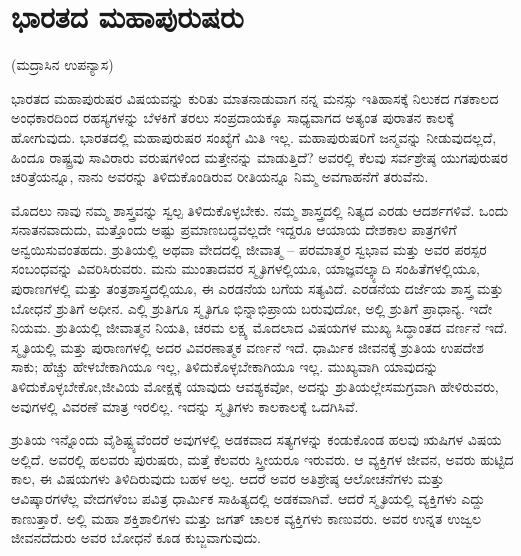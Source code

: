
\chapter{ಭಾರತದ ಮಹಾಪುರುಷರು}

\begin{center}
(ಮದ್ರಾಸಿನ ಉಪನ್ಯಾಸ)
\end{center}

ಭಾರತದ ಮಹಾಪುರುಷರ ವಿಷಯವನ್ನು ಕುರಿತು ಮಾತನಾಡುವಾಗ ನನ್ನ ಮನಸ್ಸು ಇತಿಹಾಸಕ್ಕೆ ನಿಲುಕದ ಗತಕಾಲದ ಅಂಧಕಾರದಿಂದ ರಹಸ್ಯಗಳನ್ನು ಬೆಳಕಿಗೆ ತರಲು ಸಂಪ್ರದಾಯಕ್ಕೂ ಸಾಧ್ಯವಾಗದ ಅತ್ಯಂತ ಪುರಾತನ ಕಾಲಕ್ಕೆ ಹೋಗುವುದು. ಭಾರತದಲ್ಲಿ ಮಹಾಪುರುಷರ ಸಂಖ್ಯೆಗೆ ಮಿತಿ ಇಲ್ಲ. ಮಹಾಪುರುಷರಿಗೆ ಜನ್ಮವನ್ನು ನೀಡುವುದಲ್ಲದೆ, ಹಿಂದೂ ರಾಷ್ಟ್ರವು ಸಾವಿರಾರು ವರುಷ\-ಗಳಿಂದ ಮತ್ತೇನನ್ನು ಮಾಡುತ್ತಿದೆ? ಅವರಲ್ಲಿ ಕೆಲವು ಸರ್ವಶ್ರೇಷ್ಠ ಯುಗಪುರುಷರ ಚರಿತ್ರೆಯನ್ನೂ, ನಾನು ಅವರನ್ನು ತಿಳಿದುಕೊಂಡಿರುವ ರೀತಿಯನ್ನೂ ನಿಮ್ಮ ಅವಗಾಹನೆಗೆ ತರುವೆನು.

\vskip 2pt

ಮೊದಲು ನಾವು ನಮ್ಮ ಶಾಸ್ತ್ರವನ್ನು ಸ್ವಲ್ಪ ತಿಳಿದುಕೊಳ್ಳಬೇಕು. ನಮ್ಮ ಶಾಸ್ತ್ರದಲ್ಲಿ ನಿತ್ಯದ ಎರಡು ಆದರ್ಶಗಳಿವೆ. ಒಂದು ಸನಾತನವಾದುದು, ಮತ್ತೊಂದು ಅಷ್ಟು ಪ್ರಮಾಣಬದ್ಧವಲ್ಲದೇ ಇದ್ದರೂ ಆಯಾಯ ದೇಶಕಾಲ ಪಾತ್ರಗಳಿಗೆ ಅನ್ವಯಿಸುವಂತಹದು. ಶ್ರುತಿಯಲ್ಲಿ ಅಥವಾ ವೇದದಲ್ಲಿ ಜೀವಾತ್ಮ – ಪರಮಾತ್ಮರ ಸ್ವಭಾವ ಮತ್ತು ಅವರ ಪರಸ್ಪರ ಸಂಬಂಧವನ್ನು ವಿವರಿಸಿರುವರು. ಮನು ಮುಂತಾದವರ ಸ್ಮೃತಿಗಳಲ್ಲಿಯೂ, ಯಾಜ್ಞವಲ್ಕ್ಯಾದಿ ಸಂಹಿತೆಗಳಲ್ಲಿಯೂ, ಪುರಾಣಗಳಲ್ಲಿ ಮತ್ತು ತಂತ್ರಶಾಸ್ತ್ರದಲ್ಲಿಯೂ, ಈ ಎರಡನೆಯ ಬಗೆಯ ಸತ್ಯವಿದೆ. ಎರಡನೆಯ ದರ್ಜೆಯ ಶಾಸ್ತ್ರ ಮತ್ತು ಬೋಧನೆ ಶ್ರುತಿಗೆ ಅಧೀನ. ಎಲ್ಲಿ ಶ್ರುತಿಗೂ ಸ್ಮೃತಿಗೂ ಭಿನ್ನಾಭಿಪ್ರಾಯ ಬರುವುದೋ, ಅಲ್ಲಿ ಶ್ರುತಿಗೆ ಪ್ರಾಧಾನ್ಯ. ಇದೇ ನಿಯಮ. ಶ್ರುತಿಯಲ್ಲಿ ಜೀವಾತ್ಮನ ನಿಯತಿ, ಚರಮ ಲಕ್ಷ್ಯ ಮೊದಲಾದ ವಿಷಯಗಳ ಮುಖ್ಯ ಸಿದ್ಧಾಂತದ ವರ್ಣನೆ ಇದೆ. ಸ್ಮೃತಿಯಲ್ಲಿ ಮತ್ತು ಪುರಾಣಗಳಲ್ಲಿ ಅದರ ವಿವರಣಾತ್ಮಕ ವರ್ಣನೆ ಇದೆ. ಧಾರ್ಮಿಕ ಜೀವನಕ್ಕೆ ಶ್ರುತಿಯ ಉಪದೇಶ ಸಾಕು; ಹೆಚ್ಚು ಹೇಳಬೇಕಾಗಿಯೂ ಇಲ್ಲ, ತಿಳಿದುಕೊಳ್ಳಬೇಕಾಗಿಯೂ ಇಲ್ಲ. ಮುಖ್ಯವಾಗಿ ಯಾವುದನ್ನು ತಿಳಿದುಕೊಳ್ಳಬೇಕೋ,\break ಜೀವಿಯ ಮೋಕ್ಷಕ್ಕೆ ಯಾವುದು ಆವಶ್ಯಕವೋ, ಅದನ್ನು ಶ್ರುತಿಯಲ್ಲೇ\break ಸಮಗ್ರವಾಗಿ ಹೇಳಿರುವರು, ಅವುಗಳಲ್ಲಿ ವಿವರಣೆ ಮಾತ್ರ ಇರಲಿಲ್ಲ. ಇದನ್ನು ಸ್ಮೃತಿಗಳು ಕಾಲಕಾಲಕ್ಕೆ ಒದಗಿಸಿವೆ.

ಶ್ರುತಿಯ ಇನ್ನೊಂದು ವೈಶಿಷ್ಟ್ಯವೆಂದರೆ ಅವುಗಳಲ್ಲಿ ಅಡಕವಾದ ಸತ್ಯಗಳನ್ನು ಕಂಡುಕೊಂಡ ಹಲವು ಋಷಿಗಳ ವಿಷಯ ಅಲ್ಲಿದೆ. ಅವರಲ್ಲಿ ಹಲವರು ಪುರುಷರು, ಮತ್ತೆ ಕೆಲವರು ಸ್ತ್ರೀಯರೂ ಇರುವರು. ಆ ವ್ಯಕ್ತಿಗಳ ಜೀವನ, ಅವರು ಹುಟ್ಟಿದ ಕಾಲ, ಈ ವಿಷಯಗಳು ತಿಳಿದಿರುವುದು ಬಹಳ ಅಲ್ಪ. ಆದರೆ ಅವರ ಅತಿಶ್ರೇಷ್ಠ ಆಲೋಚನೆಗಳು ಮತ್ತು ಆವಿಷ್ಕಾರಗಳೆಲ್ಲ ವೇದಗಳೆಂಬ ಪವಿತ್ರ ಧಾರ್ಮಿಕ ಸಾಹಿತ್ಯದಲ್ಲಿ ಅಡಕವಾಗಿವೆ. ಆದರೆ ಸ್ಮೃತಿಯಲ್ಲಿ ವ್ಯಕ್ತಿಗಳು ಎದ್ದು ಕಾಣುತ್ತಾರೆ. ಅಲ್ಲಿ ಮಹಾ ಶಕ್ತಿಶಾಲಿಗಳು ಮತ್ತು ಜಗತ್​ ಚಾಲಕ ವ್ಯಕ್ತಿಗಳು ಕಾಣುವರು. ಅವರ ಉನ್ನತ ಉಜ್ವಲ ಜೀವನದೆದುರು ಅವರ ಬೋಧನೆ ಕೂಡ ಕುಬ್ಜವಾಗುವುದು.

